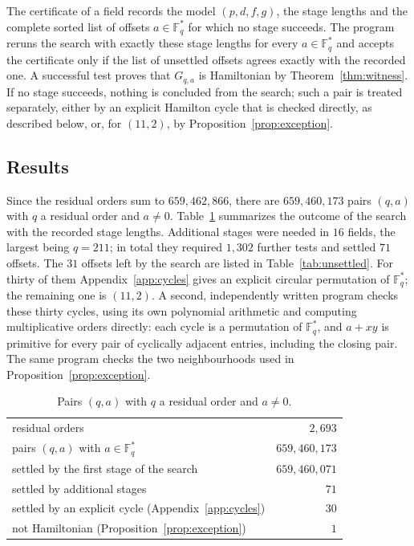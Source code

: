 \documentclass{amsart}
\theoremstyle{remark}
\numberwithin{equation}{section}
\numberwithin{table}{section}
\newcommand{\F}{\mathbb{F}}
\begin{document}
The certificate of a field records the model $(p,d,f,g)$, the stage lengths and the complete sorted list of offsets $a\in\F_q^{*}$ for which no stage succeeds. The program reruns the search with exactly these stage lengths for every $a\in\F_q^{*}$ and accepts the certificate only if the list of unsettled offsets agrees exactly with the recorded one. A successful test proves that $G_{q,a}$ is Hamiltonian by Theorem~\ref{thm:witness}. If no stage succeeds, nothing is concluded from the search; such a pair is treated separately, either by an explicit Hamilton cycle that is checked directly, as described below, or, for $(11,2)$, by Proposition~\ref{prop:exception}.

\subsection{Results}
Since the residual orders sum to $659{,}462{,}866$, there are $659{,}460{,}173$ pairs $(q,a)$ with $q$ a residual order and $a\neq0$. Table~\ref{tab:results} summarizes the outcome of the search with the recorded stage lengths. Additional stages were needed in $16$ fields, the largest being $q=211$; in total they required $1{,}302$ further tests and settled $71$ offsets. The $31$ offsets left by the search are listed in Table~\ref{tab:unsettled}. For thirty of them Appendix~\ref{app:cycles} gives an explicit circular permutation of $\F_q^{*}$; the remaining one is $(11,2)$. A second, independently written program checks these thirty cycles, using its own polynomial arithmetic and computing multiplicative orders directly: each cycle is a permutation of $\F_q^{*}$, and $a+xy$ is primitive for every pair of cyclically adjacent entries, including the closing pair. The same program checks the two neighbourhoods used in Proposition~\ref{prop:exception}.

\begin{table}[ht]
\caption{Pairs $(q,a)$ with $q$ a residual order and $a\neq0$.}\label{tab:results}
\centering
\begin{tabular}{@{}lr@{}}
\toprule
residual orders & $2{,}693$\\
pairs $(q,a)$ with $a\in\F_q^{*}$ & $659{,}460{,}173$\\
\quad settled by the first stage of the search & $659{,}460{,}071$\\
\quad settled by additional stages & $71$\\
\quad settled by an explicit cycle (Appendix~\ref{app:cycles}) & $30$\\
\quad not Hamiltonian (Proposition~\ref{prop:exception}) & $1$\\
\bottomrule
\end{tabular}
\end{table}
\end{document}
